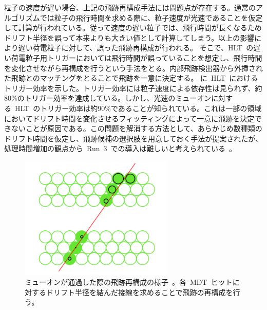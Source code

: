 粒子の速度が遅い場合、上記の飛跡再構成手法には問題点が存在する。通常のアルゴリズムでは粒子の飛行時間を求める際に、粒子速度が光速であることを仮定して計算が行われている。従って速度の遅い粒子では、飛行時間が長くなるためドリフト半径を誤って本来よりも大きい値として計算してしまう。以上の影響により遅い荷電粒子に対して、誤った飛跡再構成が行われる。
そこで、HLT~の遅い荷電粒子用トリガーにおいては飛行時間が誤っていることを想定し、飛行時間を変化させながら再構成を行うという手法をとる。内部飛跡検出器から外挿された飛跡とのマッチングをとることで飛跡を一意に決定する。
に~HLT~におけるトリガー効率を示した。トリガー効率には粒子速度による依存性は見られず、約$80\%$のトリガー効率を達成している。しかし、光速のミューオンに対する~HLT~のトリガー効率は約$90\%$であることが知られている。これは一部の領域においてドリフト時間を変化させるフィッティングによって一意に飛跡を決定できないことが原因である。この問題を解消する方法として、あらかじめ数種類のドリフト時間を仮定し、飛跡候補の選択肢を用意しておく手法が提案されたが、処理時間増加の観点から~Run~3~での導入は難しいと考えられている~\cite{MT:01}。

\begin{figure}[tbp]
        \centering   
        \includegraphics[width=0.65\textwidth,page=2]{img/pdf3/mdt.png}
        \caption[ミューオンが通過した際の飛跡再構成の様子]{ミューオンが通過した際の飛跡再構成の様子~\cite{MT:01}。各~MDT~ヒットに対するドリフト半径を結んだ接線を求めることで飛跡の再構成を行う。}
        \label{fig:mdt}
\end{figure}


